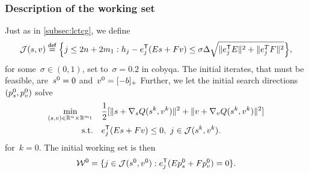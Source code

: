 \subsubsection{Description of the working set}

Just as in \cref{subsec:lctcg}, we define
\begin{equation*}
    \mathcal{J}(\sstep, v) \eqdef \set[\Big]{j \le 2n + 2m_1 : h_j - e_j^{\T}(E \sstep + F v) \le \sigma \rad \sqrt{\norm{e_j^{\T} E}^2 + \norm{e_j^{T} F}^2}},
\end{equation*}
for some~$\sigma \in (0, 1)$, set to~$\sigma = 0.2$ in \gls{cobyqa}.
The initial iterates, that must be feasible, are~$\sstep[0] = 0$ and~$v^0 = [-b]_+$
Further, we let the initial search directions~$(\pstep[0]_{\sstep}, \pstep[0]_v)$ solve
\begin{subequations}
    \label{eq:cpqp-working-set}
    \begin{align}
        \min_{(\sstep, v) \in \R^n \times \R^{m_1}} & \quad \frac{1}{2} [ \norm{\sstep + \nabla_{\sstep} Q(\sstep[k], v^k)}^2 + \norm{v + \nabla_v Q(\sstep[k], v^k)}^2 ]\\
        \text{s.t.}                                 & \quad e_j^{\T} (E \sstep + F v) \le 0, ~ j \in \mathcal{J}(\sstep[k], v^k).
    \end{align}
\end{subequations}
for~$k = 0$.
The initial working set is then
\begin{equation}
    \label{eq:cpqp-working-set-initial}
    \mathcal{W}^0 = \set{j \in \mathcal{J}(\sstep[0], v^0) : e_j^{\T}(E \pstep[0]_{\sstep} + F \pstep[0]_v) = 0}.
\end{equation}

